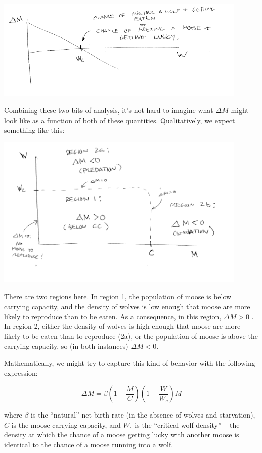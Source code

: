 \documentclass{tufte-handout}
\begin{document}
\includegraphics[width=12cm]{figs/DeltaMvsW}


Combining these two bits of analysis, it's not hard to imagine what $\Delta M$ might look like as a function of both of these quantities. Qualitatively, we expect something like this:


\includegraphics[width=12cm]{figs/DeltaMPhasePlane}


There are two regions here.  In region 1, the population of moose is below carrying capacity, and the density of wolves is low enough that moose are more likely to reproduce than to be eaten.  As a consequence, in this region, $\Delta M >0$ .  In region 2, either the density of wolves is high enough that moose are more likely to be eaten than to reproduce (2a), or the population of moose is above the carrying capacity, so (in both instances) $\Delta M<0$. 

Mathematically, we might try to capture this kind of behavior with the following expression:

$$\Delta M = \beta(1-\frac{M}{C})(1-\frac{W}{W_c})M$$

where $\beta$ is the ``natural'' net birth rate (in the absence of wolves and starvation), $C$ is the moose carrying capacity, and $W_c$ is the ``critical wolf density'' -- the density at which the chance of a moose getting lucky with another moose is identical to the chance of a moose running into a wolf.
\end{document}
